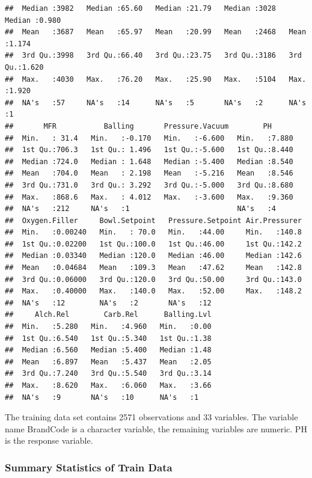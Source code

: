 \documentclass[]{article}
\begin{document}
\begin{verbatim}
##  Median :3982   Median :65.60   Median :21.79   Median :3028   Median :0.980  
##  Mean   :3687   Mean   :65.97   Mean   :20.99   Mean   :2468   Mean   :1.174  
##  3rd Qu.:3998   3rd Qu.:66.40   3rd Qu.:23.75   3rd Qu.:3186   3rd Qu.:1.620  
##  Max.   :4030   Max.   :76.20   Max.   :25.90   Max.   :5104   Max.   :1.920  
##  NA's   :57     NA's   :14      NA's   :5       NA's   :2      NA's   :1      
##       MFR           Balling       Pressure.Vacuum        PH       
##  Min.   : 31.4   Min.   :-0.170   Min.   :-6.600   Min.   :7.880  
##  1st Qu.:706.3   1st Qu.: 1.496   1st Qu.:-5.600   1st Qu.:8.440  
##  Median :724.0   Median : 1.648   Median :-5.400   Median :8.540  
##  Mean   :704.0   Mean   : 2.198   Mean   :-5.216   Mean   :8.546  
##  3rd Qu.:731.0   3rd Qu.: 3.292   3rd Qu.:-5.000   3rd Qu.:8.680  
##  Max.   :868.6   Max.   : 4.012   Max.   :-3.600   Max.   :9.360  
##  NA's   :212     NA's   :1                         NA's   :4      
##  Oxygen.Filler     Bowl.Setpoint   Pressure.Setpoint Air.Pressurer  
##  Min.   :0.00240   Min.   : 70.0   Min.   :44.00     Min.   :140.8  
##  1st Qu.:0.02200   1st Qu.:100.0   1st Qu.:46.00     1st Qu.:142.2  
##  Median :0.03340   Median :120.0   Median :46.00     Median :142.6  
##  Mean   :0.04684   Mean   :109.3   Mean   :47.62     Mean   :142.8  
##  3rd Qu.:0.06000   3rd Qu.:120.0   3rd Qu.:50.00     3rd Qu.:143.0  
##  Max.   :0.40000   Max.   :140.0   Max.   :52.00     Max.   :148.2  
##  NA's   :12        NA's   :2       NA's   :12                       
##     Alch.Rel        Carb.Rel      Balling.Lvl  
##  Min.   :5.280   Min.   :4.960   Min.   :0.00  
##  1st Qu.:6.540   1st Qu.:5.340   1st Qu.:1.38  
##  Median :6.560   Median :5.400   Median :1.48  
##  Mean   :6.897   Mean   :5.437   Mean   :2.05  
##  3rd Qu.:7.240   3rd Qu.:5.540   3rd Qu.:3.14  
##  Max.   :8.620   Max.   :6.060   Max.   :3.66  
##  NA's   :9       NA's   :10      NA's   :1
\end{verbatim}

The training data set contains 2571 observations and 33 variables. The
variable name BrandCode is a character variable, the remaining variables
are numeric. PH is the response variable.

\subsubsection{Summary Statistics of Train
Data}\label{summary-statistics-of-train-data}
\end{document}
